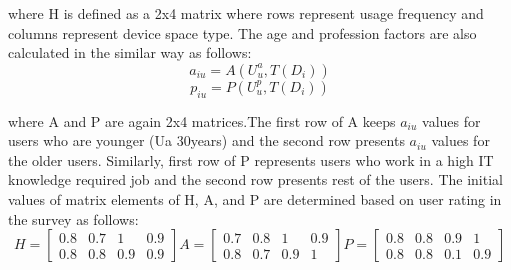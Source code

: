 \documentclass{article}
\begin{document}
where H is defined as a 2x4 matrix where rows represent usage frequency and columns represent device space type. The age and profession factors are also calculated in the similar way as follows:
         \begin{equation}
             a_{iu} = A(U_u^a,T(D_i))
         \end{equation}
         \begin{equation}
             p_{iu} = P(U_u^p,T(D_i))
         \end{equation}

where A and P are again 2x4 matrices.The first row of A keeps $a_{iu}$ values for users who are younger (Ua \leq 30years) and the second row presents $a_{iu}$ values for the older users. Similarly, first row of P represents users who work in a high IT knowledge required job and the second row presents rest of the users. The initial values of matrix elements of H, A, and P are determined based on user rating in the survey as follows: 
         \begin{equation}
             H =  \left[ \begin{array}{cccc}
0.8 & 0.7 & 1 & 0.9 \\
0.8 & 0.8 & 0.9 & 0.9  \end{array} \right]   A =  \left[ \begin{array}{cccc}
0.7 & 0.8 & 1 & 0.9 \\
0.8 & 0.7 & 0.9 & 1  \end{array} \right]    P =  \left[ \begin{array}{cccc}
0.8 & 0.8 & 0.9 & 1 \\
0.8 & 0.8 & 0.1 & 0.9  \end{array} \right]
         \end{equation}
         
\end{document}
